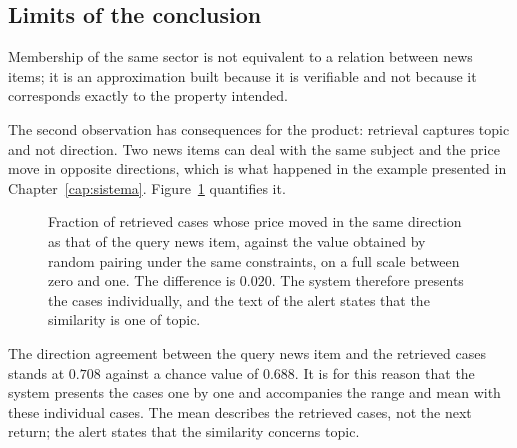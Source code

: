 \subsection{Limits of the conclusion}

Membership of the same sector is not equivalent to a relation between news items; it is an
approximation built because it is verifiable and not because it corresponds exactly to the property
intended.

The second observation has consequences for the product: retrieval captures topic and not
direction. Two news items can deal with the same subject and the price move in opposite directions,
which is what happened in the example presented in Chapter~\ref{cap:sistema}.
Figure~\ref{fig:av_direcao} quantifies it.

\begin{figure}[htbp]
\centering
{}
\caption[Topic and direction are not the same property]{Fraction of retrieved cases whose price
moved in the same direction as that of the query news item, against the value obtained by random
pairing under the same constraints, on a full scale between zero and one. The difference is
$0.020$. The system therefore presents the cases individually, and the text of the alert states
that the similarity is one of topic.}
\label{fig:av_direcao}
\end{figure}

The direction agreement between the query news item and the retrieved cases stands at $0.708$
against a chance value of $0.688$. It is for this reason that the system presents the cases one by
one and accompanies the range and mean with these individual cases. The mean describes the
retrieved cases, not the next return; the alert states that the similarity concerns topic.

